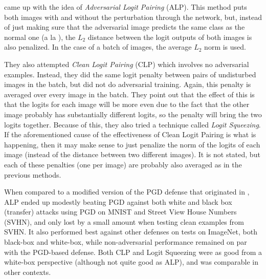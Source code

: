 \cite{kannan2018adversarial} came up with the idea of \textit{Adversarial Logit Pairing} (ALP). This
method puts both images with and without the perturbation through the network, but, instead of just
making sure that the adversarial image predicts the same class as the normal one (a la
\cite{goodfellow2015explaining}), the $L_2$ distance between the logit outputs of both images is
also penalized. In the case of a batch of images, the average $L_2$ norm is used.

They also attempted \textit{Clean Logit Pairing} (CLP) which involves no adversarial examples.
Instead, they did the same logit penalty between pairs of undisturbed images in the batch, but did
not do adversarial training. Again, this penalty is averaged over every image in the batch. They
point out that the effect of this is that the logits for each image will be more even due to the
fact that the other image probably has substantially different logits, so the penalty will bring the
two logits together. Because of this, they also tried a technique called \textit{Logit Squeezing}.
If the aforementioned cause of the effectiveness of Clean Logit Pairing is what is happening, then
it may make sense to just penalize the norm of the logits of each image (instead of the distance
between two different images). It is not stated, but each of these penalties (one per image) are
probably also averaged as in the previous methods.

When compared to a modified version of the PGD defense that originated in \cite{madry2019deep}, ALP
ended up modestly beating PGD against both white and black box (transfer) attacks using PGD on
MNIST\cite{lecun} and Street View House Numbers (SVHN)\cite{yuval}, and only lost by a small amount
when testing clean examples from SVHN. It also performed best against other defenses on tests on
ImageNet\cite{ILSVRC15}, both black-box and white-box, while non-adversarial performance remained on
par with the PGD-based defense. Both CLP and Logit Squeezing were as good from a white-box
perspective (although not quite good as ALP), and was comparable in other contexts.

